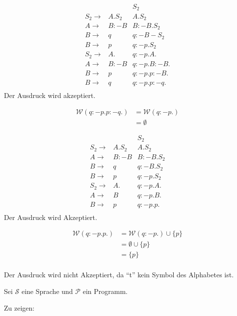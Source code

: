 \documentclass[a4paper,twoside]{homeworkassignment}
\begin{document}
\begin{align*}
         &&S_2\\
S_2 \rightarrow & A.S_2 & A.S_2\\ 
A   \rightarrow & B:-B & B:-B.S_2\\
B   \rightarrow & q & q:-B-S_2\\
B   \rightarrow & p & q:-p.S_2\\
S_2 \rightarrow & A. & q:-p.A.\\
A   \rightarrow & B:-B & q:-p.B:-B.\\
B   \rightarrow & p & q:-p.p:-B.\\
B   \rightarrow & q & q:-p.p:-q.\\
\end{align*}
Der Ausdruck wird akzeptiert.

\begin{align*}
\mathcal{W}(q:-p.p:-q.) & = \mathcal{W}(q:-p.)\\
& = \emptyset 
\end{align*}

\newsubsubproblem

\begin{align*}
&&S_2\\
S_2 \rightarrow & A.S_2 & A.S_2\\
A   \rightarrow & B:-B & B:-B.S_2\\
B   \rightarrow & q & q:-B.S_2\\
B   \rightarrow & p & q:-p.S_2\\
S_2 \rightarrow & A. & q:-p.A.\\
A   \rightarrow & B & q:-p.B.\\
B   \rightarrow & p & q:-p.p.\\
\end{align*}
Der Ausdruck wird Akzeptiert.

\begin{align*}
\mathcal{W}(q:-p.p.) & = \mathcal{W}(q:-p.) \cup \{ p \}\\
& = \emptyset \cup \{ p \}\\
& = \{ p \}\\
\end{align*}

\newsubsubproblem

Der Ausdruck wird nicht Akzeptiert, da \enquote{t} kein Symbol des Alphabetes ist.
\newsubproblem

Sei $\mathcal{S}$ eine Sprache und $\mathcal{P}$ ein Programm.

Zu zeigen:\\
\end{document}
